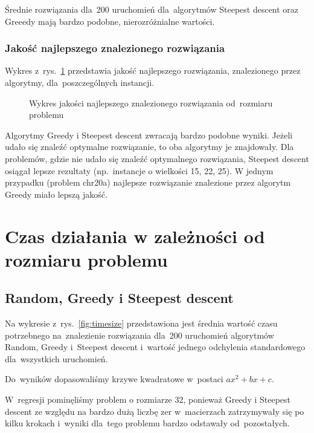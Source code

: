 \documentclass[a4paper,10pt]{article}
\begin{document}
Średnie rozwiązania dla~200 uruchomień dla~algorytmów Steepest descent oraz Greeedy mają bardzo podobne, nierozróżnialne wartości.

\subsubsection{Jakość najlepszego znalezionego rozwiązania}
Wykres z~rys.~\ref{fig:qualityvssizemax} przedstawia jakość najlepszego rozwiązania, znalezionego przez algorytmy, dla~poszczególnych instancji.

\begin{figure}[!htpb]
\begin{center}

\caption{Wykres jakości najlepszego znalezionego rozwiązania od~rozmiaru problemu}
\label{fig:qualityvssizemax}
\end{center}
\end{figure}

Algorytmy Greedy i Steepest descent zwracają bardzo podobne wyniki.
Jeżeli udało się znaleźć optymalne rozwiązanie, to oba algorytmy je znajdowały.
Dla problemów, gdzie nie udało się znaleźć optymalnego rozwiązania, Steepest descent osiągał lepsze rezultaty (np.~instancje o wielkości 15, 22, 25).
W jednym przypadku (problem chr20a) najlepsze rozwiązanie znalezione przez algorytm Greedy miało lepszą jakość. 

\section{Czas działania w zależności od rozmiaru problemu}
\subsection{Random, Greedy i Steepest descent}
Na wykresie z~rys.~\ref{fig:timesize} przedstawiona jest średnia wartość czasu potrzebnego na~znalezienie rozwiązania dla~200 uruchomień algorytmów Random, Greedy i~Steepest descent i~wartość jednego odchylenia standardowego dla~wszystkich uruchomień.

Do~wyników dopasowaliśmy krzywe kwadratowe w~postaci $ax^2+bx+c$.

W~regresji pominęliśmy problem o rozmiarze 32, ponieważ Greedy i Steepest descent ze względu na bardzo dużą liczbę zer
w~macierzach zatrzymywały się po kilku krokach i~wyniki dla~tego problemu bardzo odstawały od~pozostałych.

\end{document}
